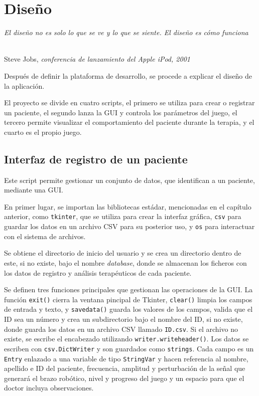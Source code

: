 \chapter{Diseño}
\label{cap:capitulo4}

\begin{flushright}
\begin{minipage}[]{9cm}
\emph{El diseño no es solo lo que se ve y lo que se siente. El diseño es cómo funciona}\\
\end{minipage}\\

Steve Jobs, \textit{conferencia de lanzamiento del Apple iPod, 2001}\\
\end{flushright}

\vspace{1cm}

Después de definir la plataforma de desarrollo, se procede a explicar el diseño de la aplicación.

El proyecto se divide en cuatro scripts, el primero se utiliza para crear o registrar un paciente, el segundo lanza la GUI y controla los parámetros del juego, el tercero permite visualizar el comportamiento del paciente durante la terapia, y el cuarto es el propio juego.

\section{Interfaz de registro de un paciente}
\label{section:registro}

Este script permite gestionar un conjunto de datos, que identifican a un paciente, mediante una GUI.

En primer lugar, se importan las bibliotecas estádar, mencionadas en el capítulo anterior, como \verb|tkinter|, que se utiliza para crear la interfaz gráfica, \verb|csv| para guardar los datos en un archivo CSV para su posterior uso, y \verb|os| para interactuar con el sistema de archivos.

Se obtiene el directorio de inicio del usuario y se crea un directorio dentro de este, si no existe, bajo el nombre \textit{database}, donde se almacenan los ficheros con los datos de registro y análisis terapéuticos de cada paciente.

Se definen tres funciones principales que gestionan las operaciones de la GUI.
La función \verb|exit()| cierra la ventana pincipal de Tkinter, \verb|clear()| limpia los campos de entrada y texto, y \verb|savedata()| guarda los valores de los campos, valida que el ID sea un número y crea un subdirectorio bajo el nombre del ID, si no existe, donde guarda los datos en un archivo CSV llamado \verb|ID.csv|.
Si el archivo no existe, se escribe el encabezado utilizando \verb|writer.writeheader()|.
Los datos se escriben con \verb|csv.DictWriter| y son guardados como \verb|strings|.
Cada campo es un \verb|Entry| enlazado a una variable de tipo \verb|StringVar| y hacen referencia al nombre, apellido e ID del paciente, frecuencia, amplitud y perturbación de la señal que generará el brazo robótico, nivel y progreso del juego y un espacio para que el doctor incluya observaciones.


